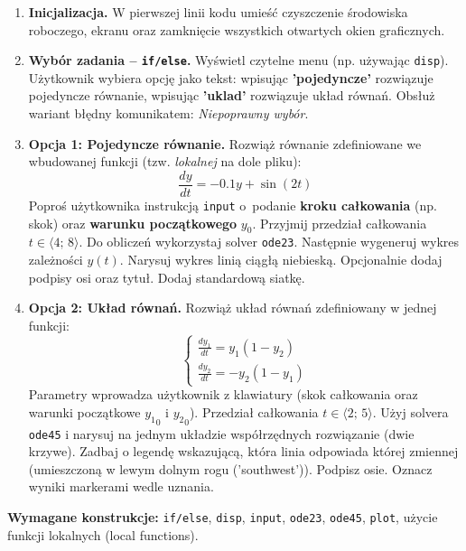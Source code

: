 \documentclass[a4paper,11pt]{article}
\begin{document}
\begin{enumerate}[leftmargin=*, label=\textbf{\arabic*.}, itemsep=2pt]

  \item \textbf{Inicjalizacja.}
    W pierwszej linii kodu umieść czyszczenie środowiska roboczego, ekranu oraz zamknięcie wszystkich otwartych okien graficznych.

  \item \textbf{Wybór zadania -- \texttt{if/else}.}
    Wyświetl czytelne menu (np. używając \texttt{disp}). Użytkownik wybiera opcję jako tekst: wpisując \textbf{'pojedyncze'} rozwiązuje pojedyncze równanie, wpisując \textbf{'uklad'} rozwiązuje układ równań. Obsłuż wariant błędny komunikatem: \textit{Niepoprawny wybór}.

  \item \textbf{Opcja 1: Pojedyncze równanie.}
    Rozwiąż równanie zdefiniowane we wbudowanej funkcji (tzw. \textit{lokalnej} na dole pliku):
    \[ \frac{dy}{dt} = -0.1y + \sin(2t) \]
    Poproś użytkownika instrukcją \texttt{input} o~podanie \textbf{kroku całkowania} (np. skok) oraz \textbf{warunku początkowego} $y_0$. Przyjmij przedział całkowania $t \in \langle 4;\,8 \rangle$.
    Do obliczeń wykorzystaj solver \texttt{ode23}. Następnie wygeneruj wykres zależności $y(t)$. Narysuj wykres linią ciągłą niebieską. Opcjonalnie dodaj podpisy osi oraz tytuł. Dodaj standardową siatkę.

  \item \textbf{Opcja 2: Układ równań.}
    Rozwiąż układ równań zdefiniowany w jednej funkcji:\\[-0.5em]
    \[
    \begin{cases}
      \frac{dy_1}{dt} = y_1(1 - y_2) \\
      \frac{dy_2}{dt} = -y_2(1 - y_1)
    \end{cases}
    \]
    Parametry wprowadza użytkownik z klawiatury (skok całkowania oraz warunki początkowe $ {y_1}_{0} $ i $ {y_2}_{0} $). Przedział całkowania $t \in \langle 2;\,5 \rangle$.
    Użyj solvera \texttt{ode45} i narysuj na jednym układzie współrzędnych rozwiązanie (dwie krzywe). Zadbaj o legendę wskazującą, która linia odpowiada której zmiennej (umieszczoną w lewym dolnym rogu ('southwest')). Podpisz osie. Oznacz wyniki markerami wedle uznania.

\end{enumerate}

\vspace{0.3cm}
\begin{ramka}
\textbf{Wymagane konstrukcje:}
\texttt{if/else}, \texttt{disp}, \texttt{input}, \texttt{ode23}, \texttt{ode45}, \texttt{plot}, użycie funkcji lokalnych (local functions).
\end{ramka}
\end{document}
